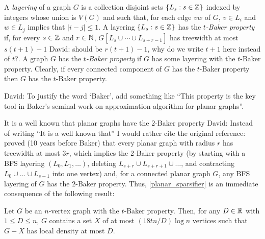 \documentclass{patmorin}
\renewcommand{\le}{\leqslant}
\newcommand{\david}[1]{{\color{orange} David: #1}}
\newcommand{\defin}[1]{\emph{\textcolor{brightmaroon}{#1}}}
\begin{document}
A \defin{layering} of a graph $G$ is a collection disjoint sets $\{L_s:s\in\mathbb{Z}\}$ indexed by integers whose union is $V(G)$ and such that, for each edge $vw$ of $G$, $v\in L_i$ and $w\in L_j$ implies that $|i-j|\le 1$.
A layering $\{L_s:s\in\mathbb{Z}\}$ has the \defin{$t$-Baker property} if, for every $s\in\mathbb{Z}$ and $r\in\mathbb{N}$, $G[L_s\cup\cdots\cup L_{s+r-1}]$ has treewidth at most $s(t+1)-1$ \david{should be $r(t+1)-1$, why do we write $t+1$ here instead of $t$?}. A graph $G$ has the \defin{$t$-Baker property} if $G$ has some layering with the $t$-Baker property.  Clearly, if every connected component of $G$ has the $t$-Baker property then $G$ has the $t$-Baker property. 

\david{To justify the word `Baker', add something like ``This property is the key tool in Baker's seminal work on approximation algorithm for planar graphs''.}

It is a well known that planar graphs have the $2$-Baker property \cite{baker:approximation} \david{Instead of writing ``It is a well known that'' I would rather cite the original reference: \citet{RS-III} proved (10 years before Baker) that every planar graph with radius $r$ has treewidth at most $3r$, which implies the 2-Baker property (by starting with a BFS layering $(L_0,L_1,\dots)$, deleting $L_{s+r}\cup L_{s+r+1}\cup\dots$, and contracting $L_0\cup\dots\cup L_{s-1}$ into one vertex)} and, for a connected planar graph $G$, any BFS layering of $G$ has the $2$-Baker property. Thus, \cref{planar_sparsifier} is an immediate consequence of the following result:

\begin{lem}\label{sparsifier_baker}
  Let $G$ be an $n$-vertex graph with the $t$-Baker property.  Then, for any $D\in\mathbb{R}$ with $1\le D\le n$, $G$ contains a set $X$ of at most $(18tn/D)\log n$ vertices such that $G-X$ has local density at most $D$.
\end{lem}
\end{document}
